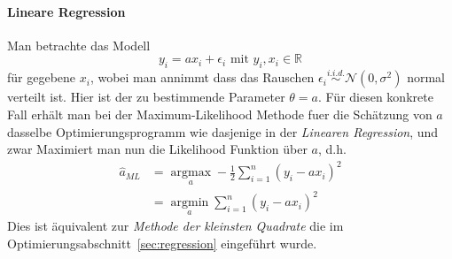 \paragraph{Lineare Regression} 
Man betrachte das Modell
\begin{equation*} 
y_{i} = ax_{i}+\epsilon_{i} \text{ mit } y_{i}, x_{i} \in \mathbb{R}
\end{equation*}
f\"ur gegebene $x_i$, wobei man annimmt dass das Rauschen $\epsilon_i \overset{i.i.d.}{\sim} \mathcal{N}(0,\sigma^2)$ normal verteilt ist. Hier ist der zu bestimmende Parameter $\theta = a$. F\"ur diesen konkrete Fall erh\"alt man bei der Maximum-Likelihood Methode fuer die Sch\"atzung von $a$ dasselbe Optimierungsprogramm wie dasjenige in der \textit{Linearen Regression}, und zwar 
Maximiert man nun die Likelihood Funktion \"uber $a$, d.h.
\begin{align*}
\hat{a}_{ML} &= \underset{a}{\operatorname{argmax}} -\frac{1}{2} \sum_{i=1}^{n} (y_{i} -ax_{i})^{2}\\
&= \underset{a}{\operatorname{argmin}} \sum_{i=1}^n (y_i - ax_i)^2
\end{align*}
Dies ist \"aquivalent zur \textit{Methode der kleinsten Quadrate} die im Optimierungsabschnitt~\ref{sec:regression} eingef\"uhrt wurde.



